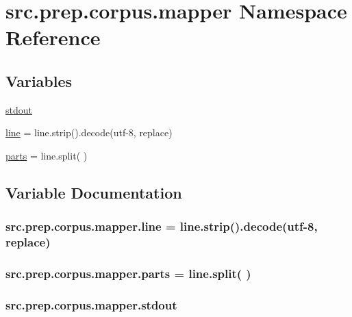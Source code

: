 \hypertarget{namespacesrc_1_1prep_1_1corpus_1_1mapper}{}\section{src.\+prep.\+corpus.\+mapper Namespace Reference}
\label{namespacesrc_1_1prep_1_1corpus_1_1mapper}
\subsection*{Variables}
\begin{DoxyCompactItemize}
\item 
\hyperlink{namespacesrc_1_1prep_1_1corpus_1_1mapper_a5a7199ccde9127a52c3c46d0577defc7}{stdout}
\item 
\hyperlink{namespacesrc_1_1prep_1_1corpus_1_1mapper_ae8cf416c60859acbba8299c43dfcb723}{line} = line.\+strip().decode(\textquotesingle{}utf-\/8\textquotesingle{}, \textquotesingle{}replace\textquotesingle{})
\item 
\hyperlink{namespacesrc_1_1prep_1_1corpus_1_1mapper_ac543445e4d0fa314751ae2423b1b64f5}{parts} = line.\+split(\textquotesingle{} \textquotesingle{})
\end{DoxyCompactItemize}


\subsection{Variable Documentation}
\subsubsection[{\texorpdfstring{line}{line}}]{\setlength{\rightskip}{0pt plus 5cm}src.\+prep.\+corpus.\+mapper.\+line = line.\+strip().decode(\textquotesingle{}utf-\/8\textquotesingle{}, \textquotesingle{}replace\textquotesingle{})}\hypertarget{namespacesrc_1_1prep_1_1corpus_1_1mapper_ae8cf416c60859acbba8299c43dfcb723}{}\label{namespacesrc_1_1prep_1_1corpus_1_1mapper_ae8cf416c60859acbba8299c43dfcb723}
\subsubsection[{\texorpdfstring{parts}{parts}}]{\setlength{\rightskip}{0pt plus 5cm}src.\+prep.\+corpus.\+mapper.\+parts = line.\+split(\textquotesingle{} \textquotesingle{})}\hypertarget{namespacesrc_1_1prep_1_1corpus_1_1mapper_ac543445e4d0fa314751ae2423b1b64f5}{}\label{namespacesrc_1_1prep_1_1corpus_1_1mapper_ac543445e4d0fa314751ae2423b1b64f5}
\subsubsection[{\texorpdfstring{stdout}{stdout}}]{\setlength{\rightskip}{0pt plus 5cm}src.\+prep.\+corpus.\+mapper.\+stdout}\hypertarget{namespacesrc_1_1prep_1_1corpus_1_1mapper_a5a7199ccde9127a52c3c46d0577defc7}{}\label{namespacesrc_1_1prep_1_1corpus_1_1mapper_a5a7199ccde9127a52c3c46d0577defc7}
